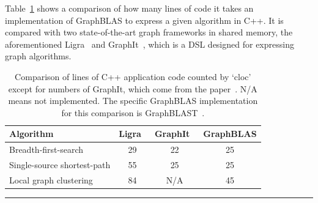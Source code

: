 Table~\ref{tab:loc} shows a comparison of how many lines of code it takes an implementation of GraphBLAS to express a given algorithm in C++. It is compared with two state-of-the-art graph frameworks in shared memory, the aforementioned Ligra~\cite{Shun:2013:Ligra} and GraphIt~\cite{Zhang:2018:GHP}, which is a DSL designed for expressing graph algorithms.

\begin{table}[t]
	\centering
	\begin{tabular}{lccc}
		\toprule
		Algorithm      & Ligra~\cite{Shun:2013:Ligra} & GraphIt~\cite{Zhang:2018:GHP} & GraphBLAS  \\ \midrule
		Breadth-first-search & 29 & 22  & 25 \\
		Single-source shortest-path   & 55 & 25 & 25 \\
		Local graph clustering  & 84 & N/A  & 45 \\ \bottomrule
	\end{tabular}
	\caption{Comparison of lines of C++ application code counted by `cloc' except for numbers of GraphIt, which come from the paper~\cite{Zhang:2018:GHP}. N/A means not implemented. The specific GraphBLAS implementation for this comparison is GraphBLAST~\cite{Yang:2019:GBL}.\label{tab:loc}}
\hrule
\end{table}
